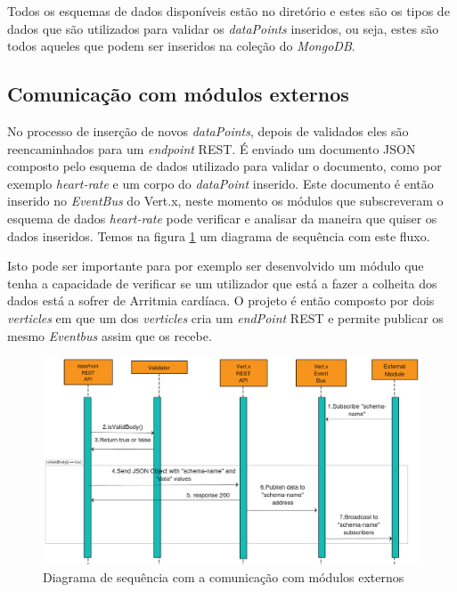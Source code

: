 Todos os esquemas de dados disponíveis estão no diretório \cite{schemas-available} e estes são os tipos de dados que são utilizados para validar os  \textit{dataPoints} inseridos, ou seja, estes são todos aqueles que podem ser inseridos na coleção do  \textit{MongoDB}.

\subsection{Comunicação com módulos externos}
No processo de inserção de novos \textit{dataPoints}, depois de validados eles são reencaminhados para um \textit{endpoint} \gls{REST}. É enviado um documento \gls{JSON} composto pelo esquema de dados utilizado para validar o documento, como por exemplo \textit{heart-rate} e um corpo do \textit{dataPoint} inserido. Este documento é então inserido no \textit{EventBus} do Vert.x, neste momento os módulos que subscreveram o esquema de dados \textit{heart-rate} pode verificar e analisar da maneira que quiser os dados inseridos. Temos na figura \ref{f:toExtSeqDiagram} um diagrama de sequência com este fluxo. \par
Isto pode ser importante para por exemplo ser desenvolvido um módulo que tenha a capacidade de verificar se um utilizador que está a fazer a colheita dos dados está a sofrer de Arritmia cardíaca.
O projeto é então composto por dois \textit{verticles} em que um dos \textit{verticles} cria um \textit{endPoint} \gls{REST} e permite publicar os mesmo \textit{Eventbus} assim que os recebe.

\begin{figure}[H]
  \centering
  \includegraphics[width=1\textwidth]{imgs/toExtSeqDiagram.png}
  \caption[Diagrama de sequência com a comunicação com módulos externos]{Diagrama de sequência com a comunicação com módulos externos}
  
  \label{f:toExtSeqDiagram}
\end{figure}


